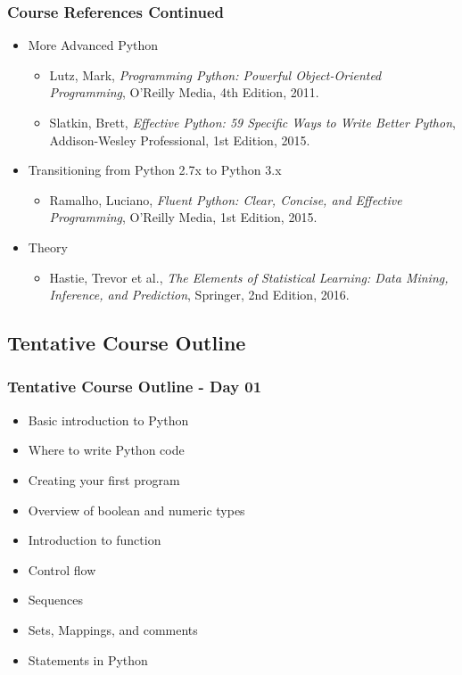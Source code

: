 \documentclass[mini frame in current subsection]{beamer}
\begin{document}
		\begin{frame}
			\frametitle{Course References Continued}
			\begin{itemize}
				\vfill\item More Advanced Python
					\begin{itemize}
						\item  Lutz, Mark, {\textit{Programming Python: Powerful Object-Oriented Programming}}, O'Reilly Media, 4th Edition, 2011.
						\item  Slatkin, Brett, {\textit{Effective Python: 59 Specific Ways to Write Better Python}}, Addison-Wesley Professional, 1st Edition, 2015.
					\end{itemize}
				\vfill\item  Transitioning from Python 2.7x to Python 3.x
					\begin{itemize}
						\item  Ramalho, Luciano, {\textit{Fluent Python: Clear, Concise, and Effective Programming}}, O'Reilly Media, 1st Edition, 2015.
					\end{itemize}
				\vfill\item  Theory
					\begin{itemize}
						\item  Hastie, Trevor et al., {\textit{The Elements of Statistical Learning: Data Mining, Inference, and Prediction}}, Springer, 2nd Edition, 2016.
				\end{itemize}
			\end{itemize}
		\end{frame}
		
	\subsection{Tentative Course Outline}
		\begin{frame}
			\frametitle{Tentative Course Outline - Day 01}
			\begin{itemize}
				\item  Basic introduction to Python
				\item  Where to write Python code
				\item  Creating your first program
				\item  Overview of boolean and numeric types
				\item  Introduction to function
				\item  Control flow
				\item  Sequences
				\item  Sets, Mappings, and comments
				\item  Statements in Python
			\end{itemize}
		\end{frame}
		
\end{document}

